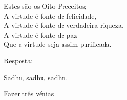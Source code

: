 \clearpage

\begin{english}
  Estes são os Oito Preceitos;\\
  A virtude é fonte de felicidade,\\
  A virtude é fonte de verdadeira riqueza,\\
  A virtude é fonte de paz ---\\
  Que a virtude seja assim purificada.
\end{english}

\begin{instruction}
  Resposta:
\end{instruction}

Sādhu, sādhu, sādhu.

\begin{instruction}
  Fazer três vénias
\end{instruction}

